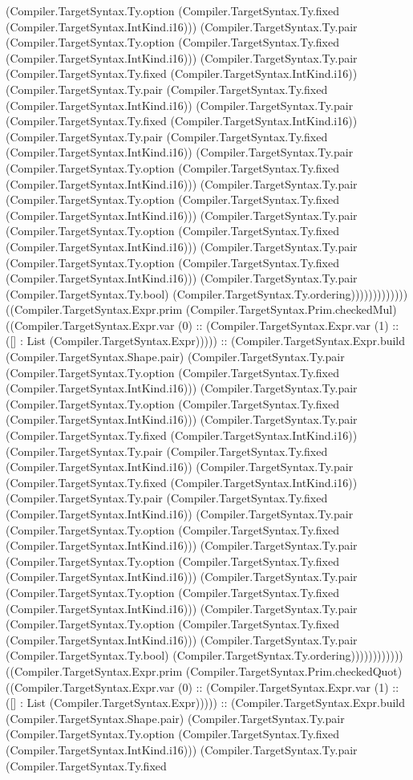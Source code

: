\documentclass[11pt]{article}
\begin{document}
(Compiler.TargetSyntax.Ty.option (Compiler.TargetSyntax.Ty.fixed (Compiler.TargetSyntax.IntKind.i16))) (Compiler.TargetSyntax.Ty.pair (Compiler.TargetSyntax.Ty.option (Compiler.TargetSyntax.Ty.fixed (Compiler.TargetSyntax.IntKind.i16))) (Compiler.TargetSyntax.Ty.pair (Compiler.TargetSyntax.Ty.fixed (Compiler.TargetSyntax.IntKind.i16)) (Compiler.TargetSyntax.Ty.pair (Compiler.TargetSyntax.Ty.fixed (Compiler.TargetSyntax.IntKind.i16)) (Compiler.TargetSyntax.Ty.pair (Compiler.TargetSyntax.Ty.fixed (Compiler.TargetSyntax.IntKind.i16)) (Compiler.TargetSyntax.Ty.pair (Compiler.TargetSyntax.Ty.fixed (Compiler.TargetSyntax.IntKind.i16)) (Compiler.TargetSyntax.Ty.pair (Compiler.TargetSyntax.Ty.option (Compiler.TargetSyntax.Ty.fixed (Compiler.TargetSyntax.IntKind.i16))) (Compiler.TargetSyntax.Ty.pair (Compiler.TargetSyntax.Ty.option (Compiler.TargetSyntax.Ty.fixed (Compiler.TargetSyntax.IntKind.i16))) (Compiler.TargetSyntax.Ty.pair (Compiler.TargetSyntax.Ty.option (Compiler.TargetSyntax.Ty.fixed (Compiler.TargetSyntax.IntKind.i16))) (Compiler.TargetSyntax.Ty.pair (Compiler.TargetSyntax.Ty.option (Compiler.TargetSyntax.Ty.fixed (Compiler.TargetSyntax.IntKind.i16))) (Compiler.TargetSyntax.Ty.pair (Compiler.TargetSyntax.Ty.bool) (Compiler.TargetSyntax.Ty.ordering))))))))))))) ((Compiler.TargetSyntax.Expr.prim (Compiler.TargetSyntax.Prim.checkedMul) ((Compiler.TargetSyntax.Expr.var (0) :: (Compiler.TargetSyntax.Expr.var (1) :: ([] : List (Compiler.TargetSyntax.Expr))))) :: (Compiler.TargetSyntax.Expr.build (Compiler.TargetSyntax.Shape.pair) (Compiler.TargetSyntax.Ty.pair (Compiler.TargetSyntax.Ty.option (Compiler.TargetSyntax.Ty.fixed (Compiler.TargetSyntax.IntKind.i16))) (Compiler.TargetSyntax.Ty.pair (Compiler.TargetSyntax.Ty.option (Compiler.TargetSyntax.Ty.fixed (Compiler.TargetSyntax.IntKind.i16))) (Compiler.TargetSyntax.Ty.pair (Compiler.TargetSyntax.Ty.fixed (Compiler.TargetSyntax.IntKind.i16)) (Compiler.TargetSyntax.Ty.pair (Compiler.TargetSyntax.Ty.fixed (Compiler.TargetSyntax.IntKind.i16)) (Compiler.TargetSyntax.Ty.pair (Compiler.TargetSyntax.Ty.fixed (Compiler.TargetSyntax.IntKind.i16)) (Compiler.TargetSyntax.Ty.pair (Compiler.TargetSyntax.Ty.fixed (Compiler.TargetSyntax.IntKind.i16)) (Compiler.TargetSyntax.Ty.pair (Compiler.TargetSyntax.Ty.option (Compiler.TargetSyntax.Ty.fixed (Compiler.TargetSyntax.IntKind.i16))) (Compiler.TargetSyntax.Ty.pair (Compiler.TargetSyntax.Ty.option (Compiler.TargetSyntax.Ty.fixed (Compiler.TargetSyntax.IntKind.i16))) (Compiler.TargetSyntax.Ty.pair (Compiler.TargetSyntax.Ty.option (Compiler.TargetSyntax.Ty.fixed (Compiler.TargetSyntax.IntKind.i16))) (Compiler.TargetSyntax.Ty.pair (Compiler.TargetSyntax.Ty.option (Compiler.TargetSyntax.Ty.fixed (Compiler.TargetSyntax.IntKind.i16))) (Compiler.TargetSyntax.Ty.pair (Compiler.TargetSyntax.Ty.bool) (Compiler.TargetSyntax.Ty.ordering)))))))))))) ((Compiler.TargetSyntax.Expr.prim (Compiler.TargetSyntax.Prim.checkedQuot) ((Compiler.TargetSyntax.Expr.var (0) :: (Compiler.TargetSyntax.Expr.var (1) :: ([] : List (Compiler.TargetSyntax.Expr))))) :: (Compiler.TargetSyntax.Expr.build (Compiler.TargetSyntax.Shape.pair) (Compiler.TargetSyntax.Ty.pair (Compiler.TargetSyntax.Ty.option (Compiler.TargetSyntax.Ty.fixed (Compiler.TargetSyntax.IntKind.i16))) (Compiler.TargetSyntax.Ty.pair (Compiler.TargetSyntax.Ty.fixed 
\end{document}
